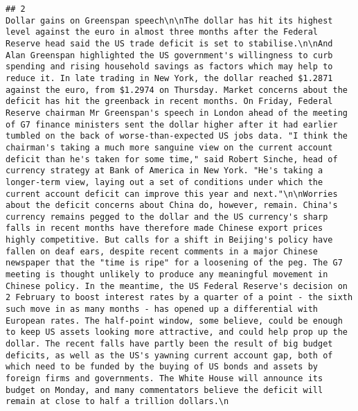 \documentclass[
]{article}
\begin{document}
\begin{verbatim}
## 2                                                                                                                                                                                                                                                                                                                        Dollar gains on Greenspan speech\n\nThe dollar has hit its highest level against the euro in almost three months after the Federal Reserve head said the US trade deficit is set to stabilise.\n\nAnd Alan Greenspan highlighted the US government's willingness to curb spending and rising household savings as factors which may help to reduce it. In late trading in New York, the dollar reached $1.2871 against the euro, from $1.2974 on Thursday. Market concerns about the deficit has hit the greenback in recent months. On Friday, Federal Reserve chairman Mr Greenspan's speech in London ahead of the meeting of G7 finance ministers sent the dollar higher after it had earlier tumbled on the back of worse-than-expected US jobs data. "I think the chairman's taking a much more sanguine view on the current account deficit than he's taken for some time," said Robert Sinche, head of currency strategy at Bank of America in New York. "He's taking a longer-term view, laying out a set of conditions under which the current account deficit can improve this year and next."\n\nWorries about the deficit concerns about China do, however, remain. China's currency remains pegged to the dollar and the US currency's sharp falls in recent months have therefore made Chinese export prices highly competitive. But calls for a shift in Beijing's policy have fallen on deaf ears, despite recent comments in a major Chinese newspaper that the "time is ripe" for a loosening of the peg. The G7 meeting is thought unlikely to produce any meaningful movement in Chinese policy. In the meantime, the US Federal Reserve's decision on 2 February to boost interest rates by a quarter of a point - the sixth such move in as many months - has opened up a differential with European rates. The half-point window, some believe, could be enough to keep US assets looking more attractive, and could help prop up the dollar. The recent falls have partly been the result of big budget deficits, as well as the US's yawning current account gap, both of which need to be funded by the buying of US bonds and assets by foreign firms and governments. The White House will announce its budget on Monday, and many commentators believe the deficit will remain at close to half a trillion dollars.\n

\end{verbatim}
\end{document}
